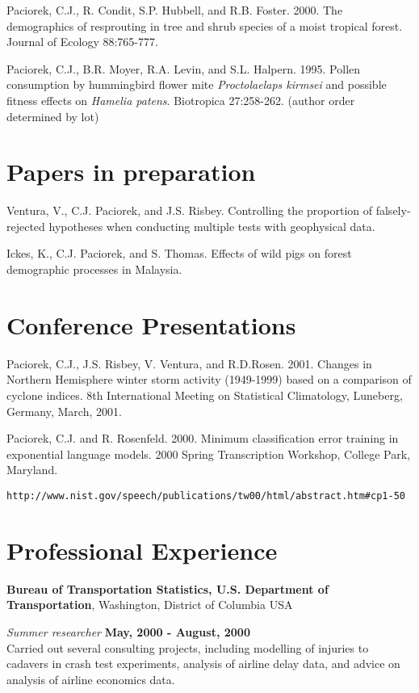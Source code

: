 \documentclass[margin,line]{res}
\begin{document}
\begin{resume}
Paciorek, C.J., R. Condit, S.P. Hubbell, and R.B. Foster.  2000.
The demographics of resprouting in tree and shrub species of a moist
tropical forest.  Journal of Ecology 88:765-777.

Paciorek, C.J., B.R. Moyer, R.A. Levin, and S.L. Halpern.  1995.
Pollen consumption by hummingbird flower mite {\it Proctolaelaps
  kirmsei} and possible fitness effects on {\it Hamelia patens}.
Biotropica 27:258-262.  (author order determined by lot)     

\section{\sc Papers in preparation}

Ventura, V., C.J. Paciorek, and J.S. Risbey.  Controlling the proportion of falsely-rejected hypotheses when conducting multiple tests with geophysical data.

Ickes, K., C.J. Paciorek, and S. Thomas.  Effects of wild pigs on
forest demographic processes in Malaysia.

\section{\sc Conference Presentations}
Paciorek, C.J., J.S. Risbey, V. Ventura, and R.D.Rosen.  2001.  Changes in Northern Hemisphere winter storm activity (1949-1999) based
on a comparison of cyclone indices.  8th International Meeting on
Statistical Climatology, Luneberg, Germany, March, 2001.

Paciorek, C.J. and R. Rosenfeld.  2000.  Minimum classification error
training in exponential language models.  2000 Spring Transcription
Workshop, College Park, Maryland.
\vspace*{-.25in}  
\begin{verbatim}http://www.nist.gov/speech/publications/tw00/html/abstract.htm#cp1-50\end{verbatim}

\section{\sc Professional Experience}
{\bf Bureau of Transportation Statistics, U.S. Department of
  Transportation}, Washington, District of Columbia USA

\vspace{-.3cm}
{\em Summer researcher} \hfill {\bf May, 2000 - August, 2000}\\
Carried out several consulting projects, including modelling of
injuries to cadavers in crash test experiments, analysis of airline
delay data, and advice on analysis of airline economics data.


\end{resume}
\end{document}
